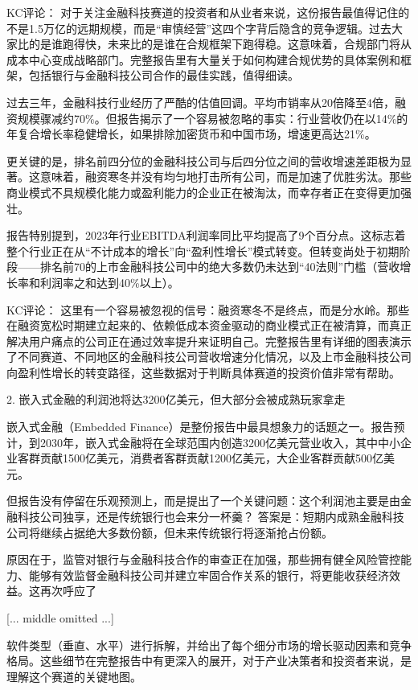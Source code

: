 \documentclass[11pt]{ctexart}
\begin{document}
KC评论： 对于关注金融科技赛道的投资者和从业者来说，这份报告最值得记住的不是1.5万亿的远期规模，而是“审慎经营”这四个字背后隐含的竞争逻辑。过去大家比的是谁跑得快，未来比的是谁在合规框架下跑得稳。这意味着，合规部门将从成本中心变成战略部门。完整报告里有大量关于如何构建合规优势的具体案例和框架，包括银行与金融科技公司合作的最佳实践，值得细读。

过去三年，金融科技行业经历了严酷的估值回调。平均市销率从20倍降至4倍，融资规模骤减约70\%。但报告揭示了一个容易被忽略的事实：行业营收仍在以14\%的年复合增长率稳健增长，如果排除加密货币和中国市场，增速更高达21\%。

更关键的是，排名前四分位的金融科技公司与后四分位之间的营收增速差距极为显著。这意味着，融资寒冬并没有均匀地打击所有公司，而是加速了优胜劣汰。那些商业模式不具规模化能力或盈利能力的企业正在被淘汰，而幸存者正在变得更加强壮。

报告特别提到，2023年行业EBITDA利润率同比平均提高了9个百分点。这标志着整个行业正在从“不计成本的增长”向“盈利性增长”模式转变。但转变尚处于初期阶段——排名前70的上市金融科技公司中的绝大多数仍未达到“40法则”门槛（营收增长率和利润率之和达到40\%以上）。

KC评论： 这里有一个容易被忽视的信号：融资寒冬不是终点，而是分水岭。那些在融资宽松时期建立起来的、依赖低成本资金驱动的商业模式正在被清算，而真正解决用户痛点的公司正在通过效率提升来证明自己。完整报告里有详细的图表演示了不同赛道、不同地区的金融科技公司营收增速分化情况，以及上市金融科技公司向盈利性增长的转变路径，这些数据对于判断具体赛道的投资价值非常有帮助。

2. 嵌入式金融的利润池将达3200亿美元，但大部分会被成熟玩家拿走

嵌入式金融（Embedded Finance）是整份报告中最具想象力的话题之一。报告预计，到2030年，嵌入式金融将在全球范围内创造3200亿美元营业收入，其中中小企业客群贡献1500亿美元，消费者客群贡献1200亿美元，大企业客群贡献500亿美元。

但报告没有停留在乐观预测上，而是提出了一个关键问题：这个利润池主要是由金融科技公司独享，还是传统银行也会来分一杯羹？ 答案是：短期内成熟金融科技公司将继续占据绝大多数份额，但未来传统银行将逐渐抢占份额。

原因在于，监管对银行与金融科技合作的审查正在加强，那些拥有健全风险管控能力、能够有效监督金融科技公司并建立牢固合作关系的银行，将更能收获经济效益。这再次呼应了

[... middle omitted ...]

软件类型（垂直、水平）进行拆解，并给出了每个细分市场的增长驱动因素和竞争格局。这些细节在完整报告中有更深入的展开，对于产业决策者和投资者来说，是理解这个赛道的关键地图。
\end{document}
